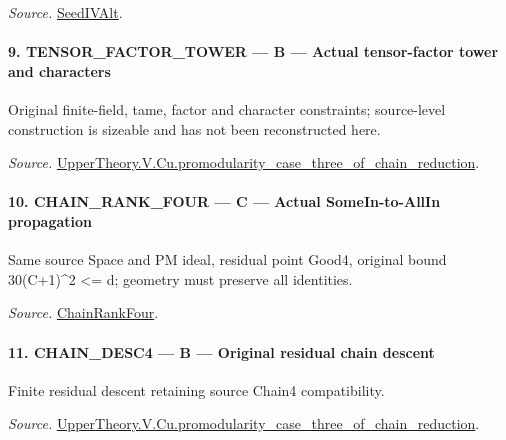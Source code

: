 \documentclass[11pt,a4paper]{article}
\numberwithin{equation}{section}
\theoremstyle{remark}\newtheorem{remark}[theorem]{Remark}
\begin{document}
\emph{Source.} \href{https://github.com/CocoSgt/riemann-hypothesis-lean/blob/7cbf7a0c32fca1badf05931879a37c3f8a2b03b4/src/Development/AutomorphicArithmetic/AutomorphicVarieties/ModularityArgument/ThresholdArguments/DenseThresholdCases/PromodularityCaseThree.lean#L19-L25}{SeedIVAlt}.



\paragraph{9. TENSOR\_\allowbreak FACTOR\_\allowbreak TOWER — B — Actual tensor-factor tower and characters}

Original finite-field, tame, factor and character constraints; source-level construction is sizeable and has not been reconstructed here.

\emph{Source.} \href{https://github.com/CocoSgt/riemann-hypothesis-lean/blob/7cbf7a0c32fca1badf05931879a37c3f8a2b03b4/src/Development/AutomorphicArithmetic/AutomorphicVarieties/ModularityArgument/ThresholdArguments/DenseThresholdCases/PromodularityCaseThreeOfLemmas.lean#L131-L153}{UpperTheory.V.Cu.promodularity\_\allowbreak case\_\allowbreak three\_\allowbreak of\_\allowbreak chain\_\allowbreak reduction}.



\paragraph{10. CHAIN\_\allowbreak RANK\_\allowbreak FOUR — C — Actual SomeIn-to-AllIn propagation}

Same source Space and PM ideal, residual point Good4, original bound 30(C+1)\textasciicircum{}2 <= d; geometry must preserve all identities.

\emph{Source.} \href{https://github.com/CocoSgt/riemann-hypothesis-lean/blob/7cbf7a0c32fca1badf05931879a37c3f8a2b03b4/src/Development/AutomorphicArithmetic/AutomorphicVarieties/ModularityArgument/ThresholdArguments/DenseThresholdCases/PromodularityCaseThree.lean#L26-L32}{ChainRankFour}.



\paragraph{11. CHAIN\_\allowbreak DESC4 — B — Original residual chain descent}

Finite residual descent retaining source Chain4 compatibility.

\emph{Source.} \href{https://github.com/CocoSgt/riemann-hypothesis-lean/blob/7cbf7a0c32fca1badf05931879a37c3f8a2b03b4/src/Development/AutomorphicArithmetic/AutomorphicVarieties/ModularityArgument/ThresholdArguments/DenseThresholdCases/PromodularityCaseThreeOfLemmas.lean#L131-L153}{UpperTheory.V.Cu.promodularity\_\allowbreak case\_\allowbreak three\_\allowbreak of\_\allowbreak chain\_\allowbreak reduction}.
\end{document}
